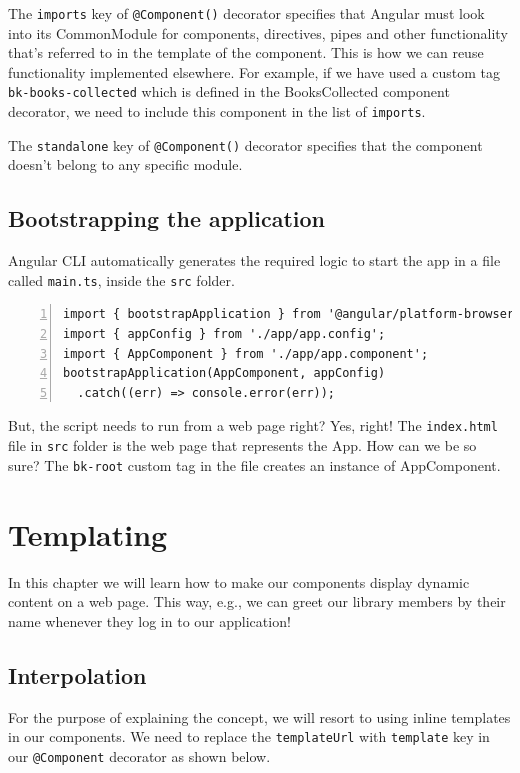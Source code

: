 \documentclass{report}
\begin{document}
The \verb|imports| key of \verb|@Component()| decorator specifies that Angular must look into its CommonModule for components, directives, pipes and other functionality that's referred to in the template of the component. This is how we can reuse functionality implemented elsewhere. For example, if we have used a custom tag \verb|bk-books-collected| which is defined in the BooksCollected component decorator, we need to include this component in the list of \verb|imports|.

The \verb|standalone| key of \verb|@Component()| decorator specifies that the component doesn't belong to any specific module.

\section{Bootstrapping the application}
Angular CLI automatically generates the required logic to start the app in a file called \verb|main.ts|, inside the \verb|src| folder.

\begin{Verbatim}[numbers=left]
import { bootstrapApplication } from '@angular/platform-browser';
import { appConfig } from './app/app.config';
import { AppComponent } from './app/app.component';
bootstrapApplication(AppComponent, appConfig)
  .catch((err) => console.error(err));
\end{Verbatim}

But, the script needs to run from a web page right? Yes, right! The \verb|index.html| file in \verb|src| folder is the web page that represents the App. How can we be so sure? The \verb|bk-root| custom tag in the file creates an instance of AppComponent.

\chapter{Templating}
In this chapter we will learn how to make our components display dynamic content on a web page. This way, e.g., we can greet our library members by their name whenever they log in to our application!

\section{Interpolation}
For the purpose of explaining the concept, we will resort to using inline templates in our components. We need to replace the \verb|templateUrl| with \verb|template| key in our \verb|@Component| decorator as shown below.
 
\end{document}
